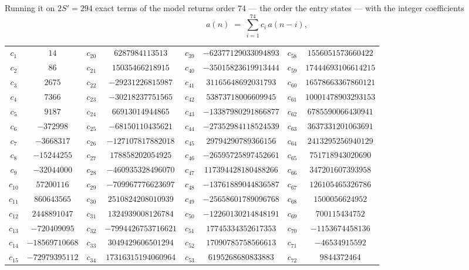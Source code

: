 \documentclass[11pt,a4paper]{article}
\theoremstyle{plain}
\theoremstyle{definition}
\begin{document}
Running it on $2S'=294$ exact terms of the model returns order $74$ --- the order the
entry states --- with the integer coefficients
\[
a(n)\;=\;\sum_{i=1}^{74}c_i\,a(n-i),
\]
\begin{center}\small
\begin{tabular}{cccccccc}
$c_{1}$ & $14$ & $c_{20}$ & $6287984113513$ & $c_{39}$ & $-62377129033094893$ & $c_{58}$ & $1556051573660422$ \\
$c_{2}$ & $86$ & $c_{21}$ & $15035466218915$ & $c_{40}$ & $-35015823619913444$ & $c_{59}$ & $17444693106614215$ \\
$c_{3}$ & $2675$ & $c_{22}$ & $-29231226815987$ & $c_{41}$ & $31165648692031793$ & $c_{60}$ & $16578663367860121$ \\
$c_{4}$ & $7366$ & $c_{23}$ & $-30218237751565$ & $c_{42}$ & $53873718006609945$ & $c_{61}$ & $10001478903293153$ \\
$c_{5}$ & $9187$ & $c_{24}$ & $66913014944865$ & $c_{43}$ & $-13387980291866877$ & $c_{62}$ & $6785590066430941$ \\
$c_{6}$ & $-372998$ & $c_{25}$ & $-68150110435621$ & $c_{44}$ & $-27352984118524539$ & $c_{63}$ & $3637331201063691$ \\
$c_{7}$ & $-3668317$ & $c_{26}$ & $-127107817882018$ & $c_{45}$ & $29794290789366156$ & $c_{64}$ & $2413295256940129$ \\
$c_{8}$ & $-15244255$ & $c_{27}$ & $178858202054925$ & $c_{46}$ & $-26595725897452661$ & $c_{65}$ & $751718943020690$ \\
$c_{9}$ & $-32044000$ & $c_{28}$ & $-460935328496070$ & $c_{47}$ & $117394428180488266$ & $c_{66}$ & $347201607393958$ \\
$c_{10}$ & $57200116$ & $c_{29}$ & $-709967776623697$ & $c_{48}$ & $-13761889044836587$ & $c_{67}$ & $126105465326786$ \\
$c_{11}$ & $860643565$ & $c_{30}$ & $2510824208010939$ & $c_{49}$ & $-25658601789096768$ & $c_{68}$ & $1500056624952$ \\
$c_{12}$ & $2448891047$ & $c_{31}$ & $1324939008126784$ & $c_{50}$ & $-12260130214848191$ & $c_{69}$ & $700115434752$ \\
$c_{13}$ & $-720409095$ & $c_{32}$ & $-7994426753716621$ & $c_{51}$ & $17745334352617353$ & $c_{70}$ & $-1153674458136$ \\
$c_{14}$ & $-18569710668$ & $c_{33}$ & $3049429606501294$ & $c_{52}$ & $17090785758566613$ & $c_{71}$ & $-46534915592$ \\
$c_{15}$ & $-72979395112$ & $c_{34}$ & $17316315194060964$ & $c_{53}$ & $6195268680833883$ & $c_{72}$ & $9844372464$ \\

\end{tabular}
\end{center}
\end{document}

